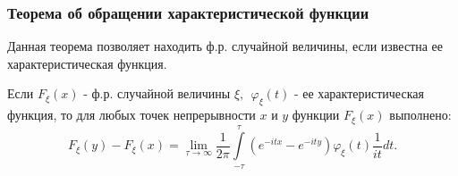     \subsubsection{Теорема об обращении характеристической функции}

    Данная теорема позволяет находить ф.р. случайной величины, если известна ее характеристическая функция.
    
    \begin{definition}\label{smd_theor_2} Если $F_{\xi}(x)$ - ф.р. случайной величины $\xi,\ \  \varphi_{\xi}(t)$ - ее характеристическая функция, то для любых точек непрерывности $x$ и $y$ функции $F_{\xi}(x)$ выполнено:
    $$
    F_{\xi}(y)-F_{\xi}(x)=\lim _{\tau \rightarrow \infty} \frac{1}{2 \pi} \int\limits_{-\tau}^\tau\left(e^{-i t x}-e^{-i t y}\right) \varphi_{\xi}(t) \frac{1}{i t} d t .
    $$
    \end{definition}
 
